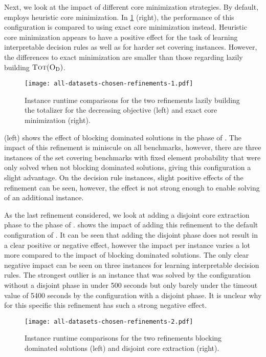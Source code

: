 Next, we look at the impact of different core minimization strategies.
By default, \msh{} employs heuristic core minimization.
In \cref{fig:refinements-1} (right), the performance of this configuration is compared to using exact core minimization instead.
Heuristic core minimization appears to have a positive effect for the task of learning interpretable decision rules as well as for harder set covering instances.
However, the differences to exact minimization are smaller than those regarding lazily building $\textsc{Tot}(\textsc{O}_{\text{D}})$.

\begin{figure}
    \centering
    \texttt{[image: all-datasets-chosen-refinements-1.pdf]}
    \caption{Instance runtime comparisons for the two refinements lazily building the totalizer for the decreasing objective (left) and exact core minimization (right).}\label{fig:refinements-1}
\end{figure}

 (left) shows the effect of blocking dominated solutions in the \satunsat{} phase of \msh{}.
The impact of this refinement is miniscule on all benchmarks, however, there are three instances of the set covering benchmarks with fixed element probability that were only solved when not blocking dominated solutions, giving this configuration a slight advantage.
On the decision rule instances, slight positive effects of the refinement can be seen, however, the effect is not strong enough to enable solving of an additional instance.

As the last refinement considered, we look at adding a disjoint core extraction phase to the \msu{} phase of \msh{}.
 shows the impact of adding this refinement to the default configuration of \msh{}.
It can be seen that adding the disjoint phase does not result in a clear positive or negative effect, however the impact per instance varies a lot more compared to the impact of blocking dominated solutions.
The only clear negative impact can be seen on three instances for learning interpretable decision rules.
The strongest outlier is an instance that was solved by the configuration without a disjoint phase in under 500 seconds but only barely under the timeout value of 5400 seconds by the configuration with a disjoint phase.
It is unclear why for this specific this refinement has such a strong negative effect.

\begin{figure}
    \centering
    \texttt{[image: all-datasets-chosen-refinements-2.pdf]}
    \caption{Instance runtime comparisons for the two refinements blocking dominated solutions (left) and disjoint core extraction (right).}\label{fig:refinements-2}
\end{figure}